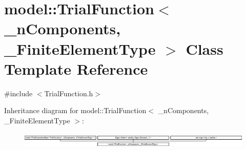 \hypertarget{classmodel_1_1_trial_function}{}\section{model\+:\+:Trial\+Function$<$ \+\_\+n\+Components, \+\_\+\+Finite\+Element\+Type $>$ Class Template Reference}
\label{classmodel_1_1_trial_function}


{\ttfamily \#include $<$Trial\+Function.\+h$>$}

Inheritance diagram for model\+:\+:Trial\+Function$<$ \+\_\+n\+Components, \+\_\+\+Finite\+Element\+Type $>$\+:\begin{figure}[H]
\begin{center}
\leavevmode
\includegraphics[height=0.749665cm]{classmodel_1_1_trial_function}
\end{center}
\end{figure}
